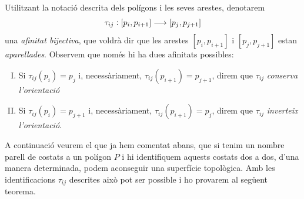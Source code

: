 \documentclass[../main.tex]{subfiles}
\begin{document}
\begin{defi}
\label{def:afinitatbijectiva} Utilitzant la notació descrita dels polígons i les seves arestes, denotarem
\begin{equation}
    \notag
    \tau_{ij}:[p_i,p_{i+1}]\longrightarrow [p_j,p_{j+1}]
\end{equation}
una \textit{afinitat bijectiva}, que voldrà dir que les arestes $[p_i,p_{i+1}]$ i $[p_j,p_{j+1}]$ estan \textit{aparellades}. Observem que només hi ha dues afinitats possibles:
\begin{enumerate}[(I)]
    \item Si $\tau_{ij}(p_i)=p_j$ i, necessàriament, $\tau_{ij}(p_{i+1})=p_{j+1}$, direm que $\tau_{ij}$ \textit{conserva l'orientació}
    \item Si $\tau_{ij}(p_i) = p_{j+1}$ i, necessàriament, $\tau_{ij}(p_{i+1}) = p_j$, direm que $\tau_{ij}$ \textit{inverteix l'orientació}.
\end{enumerate}
\end{defi}


A continuació veurem el que ja hem comentat abans, que si tenim un nombre parell de costats a un polígon $P$ i hi identifiquem aquests costats dos a dos, d'una manera determinada, podem aconseguir una superfície topològica. Amb les identificacions $\tau_{ij}$ descrites això pot ser possible i ho provarem al següent teorema.
\end{document}

